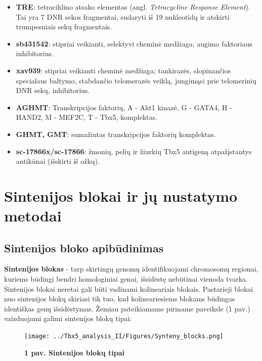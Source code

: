 \documentclass[12pt]{article}
\begin{document}
\begin{itemize}
    \item \textbf{TRE}: tetraciklino atsako elementas (angl. \emph{Tetracycline
        Response Element}). Tai yra 7 DNR sekos fragmentai,
        sudaryti iš 19 nukleotidų ir atskirti trumpesniais sekų fragmentais.
    \item \textbf{sb431542}: stipriai veikianti, selektyvi cheminė medžiaga;
        augimo faktoriaus inhibitorius.
    \item \textbf{xav939}: stipriai veikianti cheminė medžiaga; tankirazės,
        slopinančios specialaus baltymo, stabdančio telomerazės veiklą,
        jungimąsi prie telomerinių DNR sekų, inhibitorius.
    \item \textbf{AGHMT}: Transkripcijos faktorių, A - Akt1 kinazė, G - GATA4,
        H - HAND2, M - MEF2C, T - Tbx5, komplektas.
    \item \textbf{GHMT, GMT}: sumažintas transkripcijos faktorių
        komplektas.
    \item \textbf{sc-17866x/sc-17866}: žmonių, pelių ir žiurkių Tbx5 antigeną
        atpažįstantys antikūnai (išskirti iš ožkų).
\end{itemize}


\section{Sintenijos blokai ir jų nustatymo metodai}
\subsection{Sintenijos bloko apibūdinimas}

\textbf{Sintenijos blokas} - tarp skirtingų genomų identifikuojami chromosomų
regionai, kuriems būdingi bendri homologiniai genai, išsidėstę nebūtinai
vienoda tvarka. Sintenijos blokai neretai gali būti vadinami kolineariais
blokais. Pastarieji blokai nuo sintenijos blokų skiriasi tik tuo, kad
kolineariesiems blokams būdingas identiškas genų išsidėstymas. Žemiau
pateikiamame pirmame paveiksle (1 pav.) vaizduojami galimi sintenijos blokų
tipai:

\begin{figure}[htb]
    \begin{center}
        \texttt{[image: ../Tbx5\_analysis\_II/Figures/Synteny\_blocks.png]}
        \vspace{-2\baselineskip}
        \caption*{\small\textbf{1 pav. Sintenijos blokų tipai}}
        \label{fig:birds}
    \end{center}
\end{figure}
\end{document}
